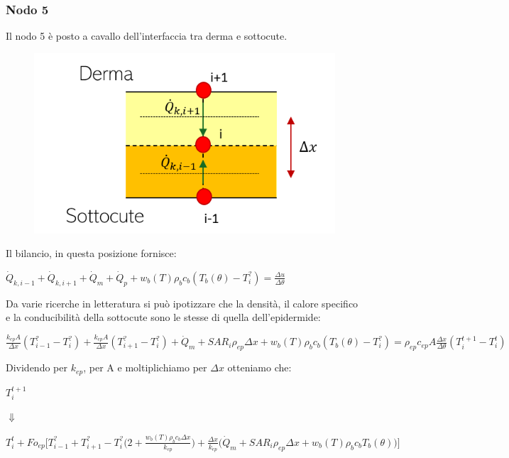 
\subsubsection*{Nodo 5}

Il nodo 5 è posto a cavallo dell'interfaccia tra derma e sottocute.
\begin{figure}[H]
    \centering
    \includegraphics[width=.6\textwidth]{Immagini/Nodi/nodo5.png} 
    \label{nodo5}
\end{figure}
\noindent
Il bilancio, in questa posizione fornisce:
\begin{center}
	$ \Dot{Q} _{k, i-1} +\Dot{Q} _{k, i+1}+ \Dot{Q} _{m} +\Dot{Q} _{p}+ w_b (T) \rho _b c_b (T_b(\theta)-T_i ^?)= \frac{\Delta u}{\Delta \theta} $
\end{center}
Da varie ricerche in letteratura si può ipotizzare che la densità, il calore specifico  e la conducibilità della sottocute sono le stesse di quella dell'epidermide:
\begin{center}
	$ \frac{k_{ep} A }{\Delta x}(T_{i-1} ^? - T_i ^? ) + \frac{k_{ep} A }{\Delta x}(T_{i+1} ^? - T_i ^? )+ \Dot{Q} _{m} + SAR_i \rho _{ep} \Delta x  + w_b (T) \rho _b c_b (T_b(\theta)-T_i ^?) = \rho _{ep} c_{ep} A \frac{\Delta x}{ \Delta \theta}(T_i ^{t+1} - T_i ^t )$
\end{center}

\noindent
Dividendo per $k_{ep}$, per A e moltiplichiamo per $\Delta x$ otteniamo che:
\begin{center}
	$T_i ^{t+1} $
\end{center}
\begin{center}
	$\Downarrow$
\end{center}
\begin{center}
	$T_i ^t + Fo_{ep} \Bigg[ T_{i-1} ^? + T_{i+1} ^?- T_i ^? \Big(2 + \frac{ w_b (T) \rho _b c_b \Delta x }{k_{ep}} \Big) +  \frac{\Delta x }{k_{ep}} \Big(\Dot{Q} _{m} +  SAR_i \rho _{ep} \Delta x + w_b (T) \rho _b c_b T_b(\theta)\Big) \Bigg]$
\end{center}

